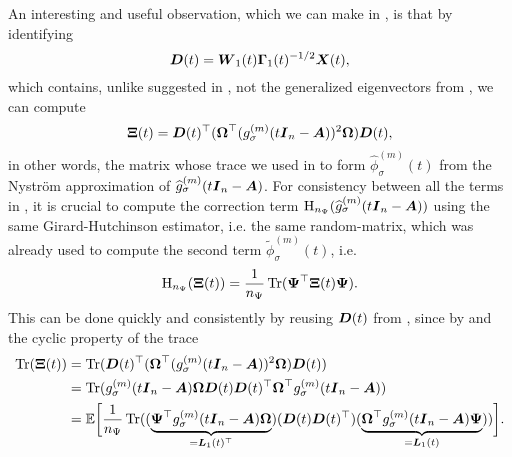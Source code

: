 An interesting and useful observation, which we can make in ,
is that by identifying
\begin{equation}
    \boldsymbol{D}(t) = \boldsymbol{W}_1(t) \boldsymbol{\Gamma}_1(t)^{-1/2} \boldsymbol{X}(t),
    \label{equ:4-nystromchebyshev-generalized-eigenvector}
\end{equation}
which contains, unlike suggested in \cite[algorithm~4]{lin2017randomized},
not the generalized eigenvectors from ,
we can compute
\begin{equation}
    \boldsymbol{\Xi}(t) = \boldsymbol{D}(t)^{\top} (\boldsymbol{\Omega}^{\top} (g_{\sigma}^{(m)}(t\boldsymbol{I}_n - \boldsymbol{A}))^2 \boldsymbol{\Omega}) \boldsymbol{D}(t),
    \label{equ:4-nystromchebyshev-generalized-eigenvector-xi}
\end{equation}
in other words, the matrix whose trace we used in 
to form $\widehat{\phi}_{\sigma}^{(m)}(t)$ from the Nystr\"om approximation of
$\widehat{g}_{\sigma}^{(m)}(t\boldsymbol{I}_n - \boldsymbol{A})$.
For consistency between all the terms in ,
it is crucial to compute the correction term $\operatorname{H}_{n_{\Psi}}(\widehat{g}_{\sigma}^{(m)}(t\boldsymbol{I}_n - \boldsymbol{A}))$
using the same Girard-Hutchinson estimator, i.e. the same \gls{random-matrix}, which was already used to compute the
second term $\widetilde{\phi}_{\sigma}^{(m)}(t)$, i.e.
\begin{equation}
    \operatorname{H}_{n_{\Psi}}(\boldsymbol{\Xi}(t)) = \frac{1}{n_{\Psi}} \operatorname{Tr}(\boldsymbol{\Psi}^{\top} \boldsymbol{\Xi}(t) \boldsymbol{\Psi}).
\end{equation}
This can be done quickly and consistently by reusing $\boldsymbol{D}(t)$ from ,
since by  and the cyclic property of the trace
\begin{align*}
    \operatorname{Tr}(\boldsymbol{\Xi}(t))
    &= \operatorname{Tr}(\boldsymbol{D}(t)^{\top} (\boldsymbol{\Omega}^{\top} (g_{\sigma}^{(m)}(t\boldsymbol{I}_n - \boldsymbol{A}))^2 \boldsymbol{\Omega}) \boldsymbol{D}(t)) \notag \\
    &= \operatorname{Tr}( g_{\sigma}^{(m)}(t\boldsymbol{I}_n - \boldsymbol{A}) \boldsymbol{\Omega} \boldsymbol{D}(t) \boldsymbol{D}(t)^{\top} \boldsymbol{\Omega}^{\top} g_{\sigma}^{(m)}(t\boldsymbol{I}_n - \boldsymbol{A})) \notag \\
    &= \mathbb{E}\bigg[\frac{1}{n_{\Psi}} \operatorname{Tr}( (\underbrace{\boldsymbol{\Psi}^{\top} g_{\sigma}^{(m)}(t\boldsymbol{I}_n - \boldsymbol{A}) \boldsymbol{\Omega}}_{=\boldsymbol{L}_1(t)^{\top}})
                                               (\boldsymbol{D}(t) \boldsymbol{D}(t)^{\top})
                                               (\underbrace{\boldsymbol{\Omega}^{\top} g_{\sigma}^{(m)}(t\boldsymbol{I}_n - \boldsymbol{A}) \boldsymbol{\Psi}}_{=\boldsymbol{L}_1(t)})) \bigg].
    \label{equ:4-nystromchebyshev-generalized-eigenvector-trace}
\end{align*}

